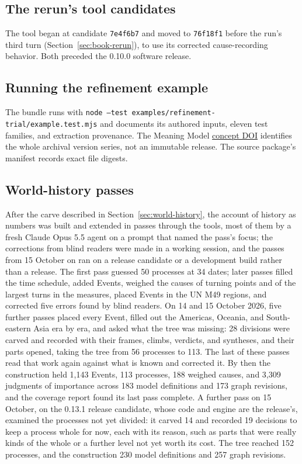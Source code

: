 \documentclass[11pt,a4paper]{article}
\begin{document}
\subsection{The rerun's tool candidates}

The tool began at candidate \texttt{7e4f6b7} and moved to \texttt{76f18f1}
before the run's third turn (Section~\ref{sec:book-rerun}), to use its corrected
cause-recording behavior. Both preceded the 0.10.0 software release.

\subsection{Running the refinement example}

The bundle runs with \texttt{node --test
examples/refinement-trial/example.test.mjs} and documents its authored inputs,
eleven test families, and extraction provenance. The Meaning Model
\href{https://doi.org/10.5281/zenodo.22313515}{concept DOI} identifies the whole
archival version series, not an immutable release. The source package's manifest
records exact file digests.

\subsection{World-history passes}
\label{app:world-history-passes}

After the carve described in Section~\ref{sec:world-history}, the account of history as numbers was built and extended in passes through
the tools, most of them by a fresh Claude Opus 5.5 agent on a prompt that named the
pass's focus; the corrections from blind readers were made in a working session,
and the passes from 15 October on ran on a release candidate or a development build rather than a
release. The first pass
guessed 50 processes at 34 dates; later passes
filled the time schedule, added Events, weighed the causes of turning points and
of the largest turns in the measures, placed Events in the UN M49 regions, and
corrected five errors found by blind readers. On 14 and 15 October 2026, five
further passes placed every Event, filled out the Americas, Oceania, and
South-eastern Asia era by era, and asked what the tree was missing: 28 divisions
were carved and recorded with their frames, climbs, verdicts, and syntheses, and
their parts opened, taking the tree from 56 processes to 113. The last of these
passes read that work again against what is known and corrected it. By then the
construction held 1,143 Events, 113 processes, 188 weighed causes, and 3,309
judgments of importance across 183 model definitions and 173 graph revisions,
and the coverage report found its last pass complete. A further pass on 15
October, on the 0.13.1 release candidate, whose code and engine are the
release's, examined the processes not yet divided: it carved 14 and recorded 19
decisions to keep a process whole for now, each with its reason, such as parts
that were really kinds of the whole or a further level not yet worth its cost.
The tree reached 152 processes, and the construction 230 model definitions and
257 graph revisions.
\end{document}
